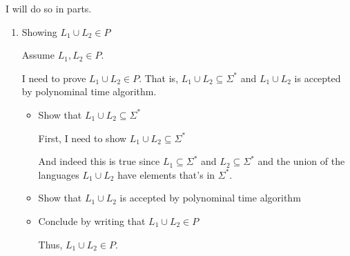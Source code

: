 \documentclass[12pt]{article}
\begin{document}
\begin{enumerate}[1.]
    \bigskip

    I will do so in parts.

    \bigskip

    \begin{enumerate}[1.]
        \item Showing $L_1 \cup L_2 \in P$

        \bigskip

        Assume $L_1,L_2 \in P$.

        \bigskip

        I need to prove $L_1 \cup L_2 \in P$. That is, $L_1 \cup L_2 \subseteq \Sigma^*$ and
        $L_1 \cup L_2$ is accepted by polynominal time algorithm.

        \bigskip

        \begin{itemize}
            \item Show that $L_1 \cup L_2 \subseteq \Sigma^*$

            \bigskip

            First, I need to show $L_1 \cup L_2 \subseteq \Sigma^*$

            \begin{mdframed}
            And indeed this is true since $L_1 \subseteq \Sigma^*$ and $L_2 \subseteq \Sigma^*$ and
            the union of the languages $L_1 \cup L_2$ have elements that's in $\Sigma^*$.
            \end{mdframed}

            \item Show that $L_1 \cup L_2$ is accepted by polynominal time algorithm
            \item Conclude by writing that $L_1 \cup L_2 \in P$

            \begin{mdframed}
            Thus, $L_1 \cup L_2 \in P$.
            \end{mdframed}
        \end{itemize}
    \end{enumerate}

\end{enumerate}
\end{document}
